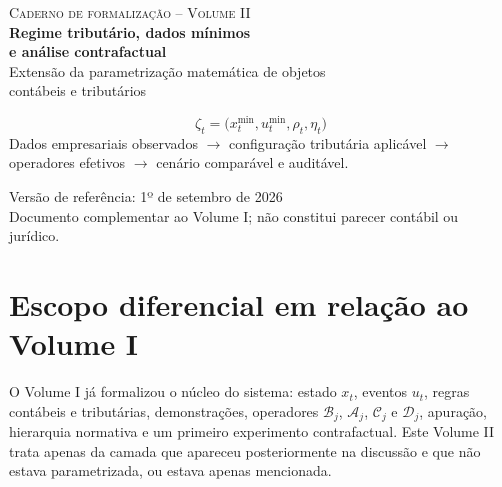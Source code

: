 \documentclass[11pt,a4paper]{article}
\newcommand{\cB}{\mathcal{B}}
\newcommand{\cA}{\mathcal{A}}
\newcommand{\cC}{\mathcal{C}}
\newcommand{\cD}{\mathcal{D}}
\begin{document}

\begin{titlepage}
\centering
\vspace*{1.2cm}
{\Large\color{Blue}\textsc{Caderno de formalização -- Volume II}}\\[0.50cm]
{\huge\bfseries\color{Navy}Regime tributário, dados mínimos\\[0.15cm]
e análise contrafactual}\\[0.65cm]
{\Large\color{Teal}Extensão da parametrização matemática de objetos\\
contábeis e tributários}\\[1.15cm]

\begin{tcolorbox}[width=0.90\textwidth,colback=LightGray,colframe=MidGray,boxrule=0.5pt,arc=2mm]
\centering
\large
\[
\boxed{\zeta_t=\bigl(x_t^{\min},u_t^{\min},\rho_t,\eta_t\bigr)}
\]
\vspace{-1mm}
\small
Dados empresariais observados $\to$ configuração tributária aplicável $\to$\\
operadores efetivos $\to$ cenário comparável e auditável.
\end{tcolorbox}

\vfill
{\large Versão de referência: 1º de setembro de 2026}\\[0.15cm]
{\small Documento complementar ao Volume I; não constitui parecer contábil ou jurídico.}
\end{titlepage}

\tableofcontents
\clearpage
{}

\section{Escopo diferencial em relação ao Volume I}

O Volume I já formalizou o núcleo do sistema: estado $x_t$, eventos $u_t$, regras contábeis e tributárias, demonstrações, operadores $\cB_j$, $\cA_j$, $\cC_j$ e $\cD_j$, apuração, hierarquia normativa e um primeiro experimento contrafactual. Este Volume II trata apenas da camada que apareceu posteriormente na discussão e que não estava parametrizada, ou estava apenas mencionada.
\end{document}
